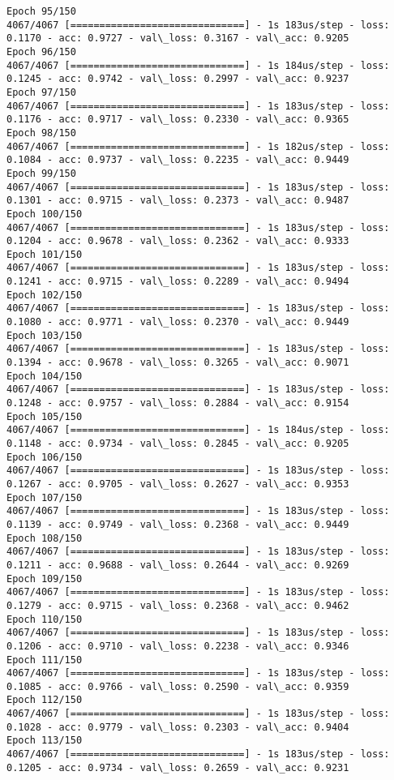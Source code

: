 \documentclass[11pt]{article}
\begin{document}
\begin{Verbatim}[commandchars=\\\{\}]
Epoch 95/150
4067/4067 [==============================] - 1s 183us/step - loss: 0.1170 - acc: 0.9727 - val\_loss: 0.3167 - val\_acc: 0.9205
Epoch 96/150
4067/4067 [==============================] - 1s 184us/step - loss: 0.1245 - acc: 0.9742 - val\_loss: 0.2997 - val\_acc: 0.9237
Epoch 97/150
4067/4067 [==============================] - 1s 183us/step - loss: 0.1176 - acc: 0.9717 - val\_loss: 0.2330 - val\_acc: 0.9365
Epoch 98/150
4067/4067 [==============================] - 1s 182us/step - loss: 0.1084 - acc: 0.9737 - val\_loss: 0.2235 - val\_acc: 0.9449
Epoch 99/150
4067/4067 [==============================] - 1s 183us/step - loss: 0.1301 - acc: 0.9715 - val\_loss: 0.2373 - val\_acc: 0.9487
Epoch 100/150
4067/4067 [==============================] - 1s 183us/step - loss: 0.1204 - acc: 0.9678 - val\_loss: 0.2362 - val\_acc: 0.9333
Epoch 101/150
4067/4067 [==============================] - 1s 183us/step - loss: 0.1241 - acc: 0.9715 - val\_loss: 0.2289 - val\_acc: 0.9494
Epoch 102/150
4067/4067 [==============================] - 1s 183us/step - loss: 0.1080 - acc: 0.9771 - val\_loss: 0.2370 - val\_acc: 0.9449
Epoch 103/150
4067/4067 [==============================] - 1s 183us/step - loss: 0.1394 - acc: 0.9678 - val\_loss: 0.3265 - val\_acc: 0.9071
Epoch 104/150
4067/4067 [==============================] - 1s 183us/step - loss: 0.1248 - acc: 0.9757 - val\_loss: 0.2884 - val\_acc: 0.9154
Epoch 105/150
4067/4067 [==============================] - 1s 184us/step - loss: 0.1148 - acc: 0.9734 - val\_loss: 0.2845 - val\_acc: 0.9205
Epoch 106/150
4067/4067 [==============================] - 1s 183us/step - loss: 0.1267 - acc: 0.9705 - val\_loss: 0.2627 - val\_acc: 0.9353
Epoch 107/150
4067/4067 [==============================] - 1s 183us/step - loss: 0.1139 - acc: 0.9749 - val\_loss: 0.2368 - val\_acc: 0.9449
Epoch 108/150
4067/4067 [==============================] - 1s 183us/step - loss: 0.1211 - acc: 0.9688 - val\_loss: 0.2644 - val\_acc: 0.9269
Epoch 109/150
4067/4067 [==============================] - 1s 183us/step - loss: 0.1279 - acc: 0.9715 - val\_loss: 0.2368 - val\_acc: 0.9462
Epoch 110/150
4067/4067 [==============================] - 1s 183us/step - loss: 0.1206 - acc: 0.9710 - val\_loss: 0.2238 - val\_acc: 0.9346
Epoch 111/150
4067/4067 [==============================] - 1s 183us/step - loss: 0.1085 - acc: 0.9766 - val\_loss: 0.2590 - val\_acc: 0.9359
Epoch 112/150
4067/4067 [==============================] - 1s 183us/step - loss: 0.1028 - acc: 0.9779 - val\_loss: 0.2303 - val\_acc: 0.9404
Epoch 113/150
4067/4067 [==============================] - 1s 183us/step - loss: 0.1205 - acc: 0.9734 - val\_loss: 0.2659 - val\_acc: 0.9231

\end{Verbatim}
\end{document}
